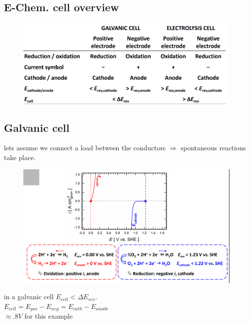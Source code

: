 \documentclass[a4paper,10pt,landscape]{scrartcl}
\begin{document}
\begin{multicols*}{3}
\subsection{E-Chem. cell overview}
\begin{figure}[H]
    \centering
    \includegraphics[width=1\linewidth]{src/cells_comp.png}
\end{figure}
\vspace{-.3cm}

\subsection{Galvanic cell}
lets assume we connect a load between the conductors $\Rightarrow$ spontaneous reactions take place.
\begin{figure}[H]
    \centering
    \includegraphics[width=1\linewidth]{src/galvanic.png}
\end{figure}
\vspace{-.6cm}
in a galvanic cell $E_{cell}<\Delta E_{rev}$.\\
$E_{cell}=E_{pos}-E_{neg}=E_{cath}-E_{anode}$\\
$\approx .8V$ for this example


\end{multicols*}
\end{document}

